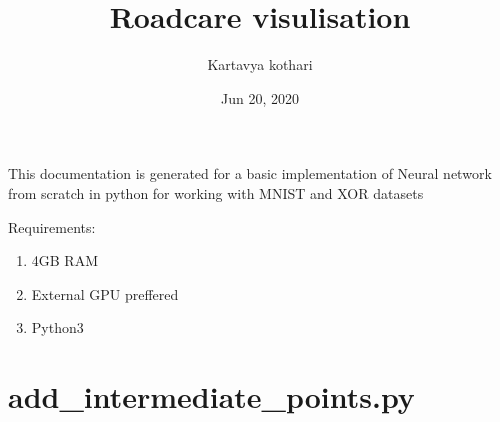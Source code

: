 \documentclass[letterpaper,10pt,english]{sphinxmanual}
\title{Roadcare visulisation}
\date{Jun 20, 2020}
\author{Kartavya kothari}
\begin{document}
\pagestyle{empty}
\sphinxmaketitle
\pagestyle{plain}
\sphinxtableofcontents
\pagestyle{normal}
\label{\detokenize{index::doc}}


This documentation is generated for a basic implementation of Neural network from scratch in python for working with MNIST and XOR datasets

Requirements:
\begin{enumerate}
%
\item {} 
4GB RAM

\item {} 
External GPU preffered

\item {} 
Python3

\end{enumerate}


\chapter{add\_intermediate\_points.py}
\label{\detokenize{add_intermediate_points:module-scripts.add_intermediate_points}}\label{\detokenize{add_intermediate_points:add-intermediate-points-py}}\label{\detokenize{add_intermediate_points::doc}}

\begin{fulllineitems}
\label{\detokenize{add_intermediate_points:scripts.add_intermediate_points.bearing_tuple}}
\end{fulllineitems}


\begin{fulllineitems}
\label{\detokenize{add_intermediate_points:scripts.add_intermediate_points.calculateDistance}}
\end{fulllineitems}
\end{document}

